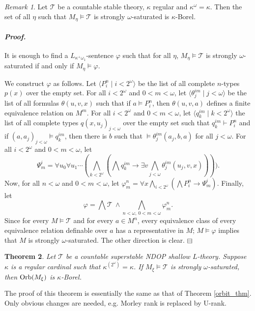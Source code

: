 \documentclass[12pt,a4paper]{amsart}
\newtheorem{thm}{Theorem}[section]
\theoremstyle{definition}
\theoremstyle{remark}
\newtheorem{remark}[thm]{Remark}
\renewcommand{\mid}{\mathrel{|}\allowbreak}
\newenvironment{cproof}{\paragraph{\emph{Proof.\,}}}{\hfill{$\boxminus$}\par\vspace{2mm}}
\def\Orb{\mbox{\rm Orb}}
\begin{document}
\begin{remark}
    Let $\mathcal{T}$ be a countable stable theory, $\kappa$ regular and $\kappa^\omega=\kappa$. Then the set of all $\eta$ such that $M_\eta\models \mathcal{T}$ is strongly $\omega$-saturated is $\kappa$-Borel. 
\begin{cproof}
    It is enough to find a $L_{\kappa^+\omega_1}$-sentence $\varphi$ such that for all $\eta$, $M_\eta\models \mathcal{T}$ is strongly $\omega$-saturated if and only if $M_\eta\models\varphi$.

    We construct $\varphi$ as follows. Let $\langle P^n_i\mid i<2^\omega\rangle$ be the list of all complete $n$-types $p(x)$ over the empty set. For all $i<2^\omega$ and $0<m<\omega$, let $\langle\theta_j^{im}\mid j<\omega\rangle$ be the list of all formulas $\theta(u,v,x)$ such that if $a\models P^n_i$, then $\theta(u,v,a)$ defines a finite equivalence relation on $M^m$. For all $i<2^\omega$ and $0<m<\omega$, let $\langle q^{im}_k\mid k<2^\omega\rangle$ the list of all complete types $q(x,u_j)_{j<\omega}$ over the empty set such that $q^{im}_k\vdash P^n_i$ and if $(a,a_j)_{j<\omega}\models q^{im}_k$, then there is $b$ such that $\models \theta^{im}_j(a_j,b,a)$ for all $j<\omega$. For all $i<2^\omega$ and $0<m<\omega$, let $$\Psi^i_m=\forall u_0\forall u_1\cdots (\bigwedge_{k<2^\omega}(\bigwedge q_k^{im}\rightarrow \exists v\bigwedge_{j<\omega}\theta_j^{im}(u_j,v,x)))).$$
    Now, for all $n<\omega$ and $0<m<\omega$, let $\varphi^n_m=\forall x \bigwedge_{i<2^\omega}(\bigwedge P^n_i\rightarrow \Psi^i_m)$. Finally, let $$\varphi=\bigwedge \mathcal{T}\ \wedge\bigwedge_{n<\omega,\ 0<m<\omega} \varphi^n_m.$$ 
    Since for every $M\models \mathcal{T}$ and for every $a\in M^n$, every equivalence class of every equivalence relation definable over $a$ has a representative in $M$; $M\models \varphi$ implies that $M$ is strongly $\omega$-saturated. The other direction is clear.
\end{cproof}
\end{remark}

\begin{thm}
    Let $\mathcal{T}$ be a countable superstable NDOP shallow $L$-theory. Suppose $\kappa$ is a regular cardinal such that $\kappa^{(2^\omega)}=\kappa$. If $M_\xi\models \mathcal{T}$ is strongly $\omega$-saturated, then $\Orb(M_\xi)$ is $\kappa$-Borel. 
\end{thm}

The proof of this theorem is essentially the same as that of Theorem \ref{orbit_thm}. Only obvious changes are needed, e.g. Morley rank is replaced by U-rank.
\end{document}
